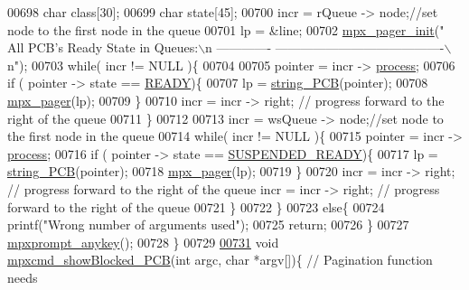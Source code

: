 \begin{DoxyCode}
{{00698                 \textcolor{keywordtype}{char} \textcolor{keyword}{class}[30];
00699                 \textcolor{keywordtype}{char} state[45];
00700                 incr = rQueue -> node;\textcolor{comment}{//set node to the first node in the queue}
00701                 lp = &line;
00702                 \hyperlink{mpx__util_8c_a60afdb7496b6ff469c6b98d2ecde15ed}{mpx_pager_init}(\textcolor{stringliteral}{" All PCB's Ready State in Queues:\(\backslash\)n -------------
      ----------------------------------------\(\backslash\)n"});
00703                 \textcolor{keywordflow}{while}( incr != NULL )\{
00704                         
00705                         pointer = incr -> \hyperlink{structprocess}{process};
00706                         \textcolor{keywordflow}{if} ( pointer -> state == \hyperlink{mpx__r2_8h_ad1235d5ce36f7267285e82dccd428aa6}{READY})\{
00707                         lp = \hyperlink{mpx__r2_8c_aa1ebf78ebfc66e910acd6efdcf6b2437}{string_PCB}(pointer);
00708                         \hyperlink{mpx__util_8c_a9e59881f10bd91d7255f18f205e101e6}{mpx_pager}(lp);
00709                         \}
00710                         incr = incr -> right; \textcolor{comment}{// progress forward to the right of
       the queue}
00711                 \}
00712                 
00713                 incr = wsQueue -> node;\textcolor{comment}{//set node to the first node in the queue}
00714                 \textcolor{keywordflow}{while}( incr != NULL )\{
00715                         pointer = incr -> \hyperlink{structprocess}{process};
00716                         \textcolor{keywordflow}{if} ( pointer -> state == \hyperlink{mpx__r2_8h_a07b1141143e8825b04670da23fca8cc7}{SUSPENDED_READY})\{
00717                         lp = \hyperlink{mpx__r2_8c_aa1ebf78ebfc66e910acd6efdcf6b2437}{string_PCB}(pointer);
00718                         \hyperlink{mpx__util_8c_a9e59881f10bd91d7255f18f205e101e6}{mpx_pager}(lp);
00719                         \}
00720                         incr = incr -> right; \textcolor{comment}{// progress forward to the right of
       the queue                      incr = incr -> right; // progress forward to the 
      right of the queue}
00721                 \}
00722         \}
00723         \textcolor{keywordflow}{else}\{
00724                 printf(\textcolor{stringliteral}{"Wrong number of arguments used"});       
00725                 \textcolor{keywordflow}{return};
00726         \}
00727         \hyperlink{mpx__util_8c_a338d01dfe3c80732c00450203c85b964}{mpxprompt_anykey}();
00728 \}
00729 
\hypertarget{mpx__r2_8c_source_l00731}{}\hyperlink{mpx__r2_8h_ae1ef92a5e3a8869ec269a23b3b854c9b}{00731} \textcolor{keywordtype}{void} \hyperlink{mpx__r2_8c_ae1ef92a5e3a8869ec269a23b3b854c9b}{mpxcmd_showBlocked_PCB}(\textcolor{keywordtype}{int} argc, \textcolor{keywordtype}{char} *argv[])\{ \textcolor{comment}{// Pagination function needs
}}}
\end{DoxyCode}
